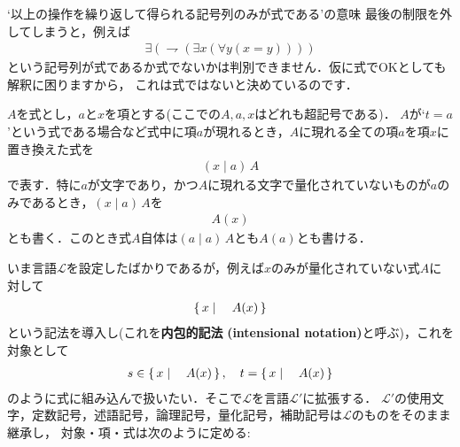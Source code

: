 	\begin{itembox}[l]{`以上の操作を繰り返して得られる記号列のみが式である'の意味}
		最後の制限を外してしまうと，例えば
		\begin{align}
			\exists (\rightharpoondown (\exists x(\forall y (x = y))))
		\end{align}
		という記号列が式であるか式でないかは判別できません．仮に式でOKとしても解釈に困りますから，
		これは式ではないと決めているのです．%
	\end{itembox}
	
	
	$A$を式とし，$a$と$x$を項とする(ここでの$A,a,x$はどれも超記号である)．
	$A$が`$t = a$'という式である場合など式中に項$a$が現れるとき，$A$に現れる全ての項$a$を項$x$に置き換えた式を
	\begin{align}
		(x \mid a)\, A
	\end{align}
	で表す．特に$a$が文字であり，かつ$A$に現れる文字で量化されていないものが$a$のみであるとき，$(x \mid a)\, A$を
	\begin{align}
		A(x)
	\end{align}
	とも書く．このとき式$A$自体は$(a \mid a)\, A$とも$A(a)$とも書ける．
	
	いま言語$\mathcal{L}$を設定したばかりであるが，例えば$x$のみが量化されていない式$A$に対して
	\begin{align}
		\left\{\, x \mid \quad A(x)\, \right\}
	\end{align}
	という記法を導入し(これを{\bf 内包的記法}
	{\bf (intensional notation)}と呼ぶ)，これを対象として
	\begin{align}
		s \in \left\{\, x \mid \quad A(x)\, \right\},\quad t = \left\{\, x \mid \quad A(x)\, \right\}
	\end{align}
	のように式に組み込んで扱いたい．そこで$\mathcal{L}$を言語$\mathcal{L}'$に拡張する．
	$\mathcal{L}'$の使用文字，定数記号，述語記号，論理記号，量化記号，補助記号は$\mathcal{L}$のものをそのまま継承し，
	対象・項・式は次のように定める:
	
